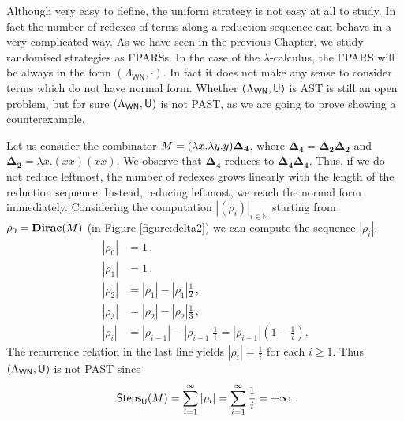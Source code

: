 Although very easy to define, the uniform strategy is not easy at all to study. In fact the number of redexes of terms along a reduction sequence can behave in a very complicated way. As we have seen in the previous Chapter, we study randomised strategies as FPARSs. In the case of the $\lambda$-calculus, the FPARS will be always in the form $(\Lambda_\mathsf{WN},\cdot)$. In fact it does not make any sense to consider terms which do not have normal form. Whether $(\Lambda_\mathsf{WN},\mathsf{U})$ is AST is still an open problem, but for sure $(\Lambda_\mathsf{WN},\mathsf{U})$ is not PAST, as we are going to prove showing a counterexample. 
\begin{example}
	Let us  consider the combinator $M=(\lambda x.\lambda y.y)\bm{\Delta_4}$, where $\bm{\Delta_4}=\bm{\Delta_2\Delta_2}$ and $\bm{\Delta_2}= \lambda x.(xx)(xx)$. We observe that $\bm{\Delta_4}$ reduces to $\bm{\Delta_4\Delta_4}$. Thus, if we do not reduce leftmost, the number of redexes grows linearly with the length of the reduction sequence. Instead, reducing leftmost, we reach the normal form immediately. Considering the computation $|(\rho_i)|_{i\in\mathbb{N}}$ starting from $\rho_0=\textbf{Dirac}(M)$ (in Figure \ref{figure:delta2}) we can compute the sequence $|\rho_i|$.
	\begin{equation*}
	\begin{split}
	|\rho_0|&=1\,,\\
	|\rho_1|&=1\,,\\
	|\rho_2|&=|\rho_1|-|\rho_1|\frac{1}{2}\,,\\
	|\rho_3|&=|\rho_2|-|\rho_2|\frac{1}{3}\,,\\
	|\rho_i|&=|\rho_{i-1}|-|\rho_{i-1}|\frac{1}{i}=|\rho_{i-1}|\left( 1-\frac{1}{i}\right).
	\end{split}
	\end{equation*}
	The recurrence relation in the last line yields $|\rho_i|=\frac{1}{i}$ for each $i\geq 1$. Thus $(\Lambda_\mathsf{WN},\mathsf{U})$ is not PAST since 
	$$
	\textsf{Steps}_{\mathsf{U}}(M)=\sum\limits_{i=1}^{\infty} \left|\rho_i\right|=\sum\limits_{i=1}^{\infty} \frac{1}{i}=+\infty.
	$$
\end{example}
